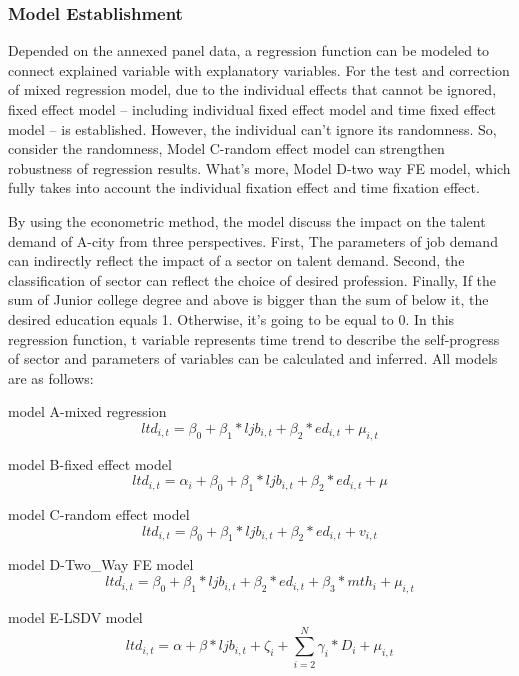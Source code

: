 \documentclass{mcmthesis}
\begin{document}
\subsubsection{Model Establishment}
Depended on the annexed panel data, a regression function can be modeled to connect explained variable with explanatory variables. For the test and correction of mixed regression model, due to the individual effects that cannot be ignored, fixed effect model -- including individual fixed effect model and time fixed effect model -- is established. However, the individual can't ignore its randomness. So, consider the randomness, Model C-random effect model can strengthen robustness of regression results. What's more, Model D-two way FE model, which fully takes into account the individual fixation effect and time fixation effect. \par\noindent
By using the econometric method, the model discuss the impact on the talent demand of A-city from three perspectives. First, The parameters of job demand can indirectly reflect the impact of a sector on talent demand. Second, the classification of sector can reflect the choice of desired profession. Finally, If the sum of Junior college degree and above is bigger than the sum of below it, the desired education equals 1. Otherwise, it's going to be equal to 0. In this regression function, t variable represents time trend to describe the self-progress of sector and parameters of variables can be calculated and inferred. All models are as follows:

\par\noindent model A-mixed regression
\begin{equation}
ltd_{i,t}=\beta_0+\beta_1*ljb_{i,t}+\beta_2*ed_{i,t}+\mu_{i,t}
\end{equation}
\par\noindent model B-fixed effect model
\begin{equation}
ltd_{i,t}=\alpha_i+\beta_0+\beta_1*ljb_{i,t}+\beta_2*ed_{i,t}+\mu
\end{equation}
\par\noindent model C-random effect model
\begin{equation}
ltd_{i,t}=\beta_0+\beta_1*ljb_{i,t}+\beta_2*ed_{i,t}+v_{i,t}
\end{equation}
\par\noindent model D-Two\_Way FE model
\begin{equation}
ltd_{i,t}=\beta_0+\beta_1*ljb_{i,t}+\beta_2*ed_{i,t}+\beta_3*mth_i+\mu_{i,t}
\end{equation}
\par\noindent model E-LSDV model
\begin{equation}
ltd_{i,t}=\alpha+\beta*ljb_{i,t}+\zeta_i+\sum_{i=2}^N\gamma_i*D_i+\mu_{i,t}
\end{equation}
\par\noindent
\end{document}
